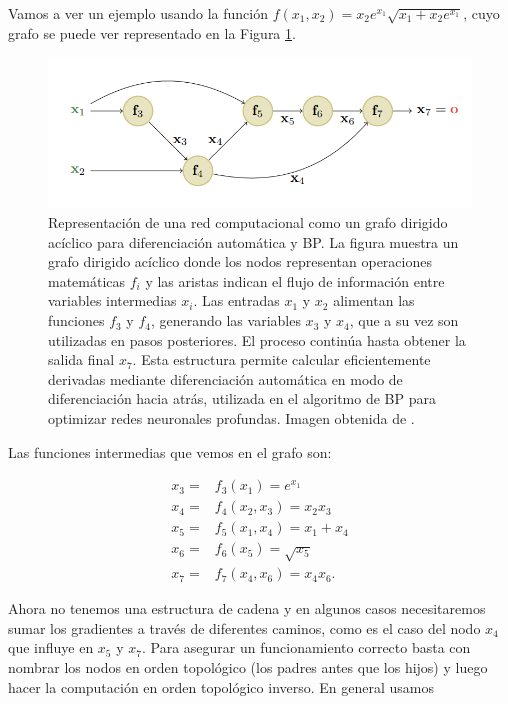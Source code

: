 Vamos a ver un ejemplo usando la función $f(x_1,x_2)=x_2e^{x_1}\sqrt{x_1+x_2e^{x_1}}$, cuyo grafo se puede ver representado en la Figura \ref{fig:def.grafo}.


\begin{figure}
    \centering
    \includegraphics[width=1.0\linewidth]{Plantilla_TFG_latex/imagenes/Mat/Definicion/graf.png}
    \caption[Representación de una red computacional como un grafo dirigido acíclico para diferenciación automática y \textit{backpropagation}]{Representación de una red computacional como un grafo dirigido acíclico para diferenciación automática y BP. La figura muestra un grafo dirigido acíclico donde los nodos representan operaciones matemáticas $f_i$  y las aristas indican el flujo de información entre variables intermedias $x_i$. Las entradas $x_1$ y $x_2$ alimentan las funciones $f_3$ y $f_4$, generando las variables $x_3$ y $x_4$, que a su vez son utilizadas en pasos posteriores. El proceso continúa hasta obtener la salida final $x_7$. Esta estructura permite calcular eficientemente derivadas mediante diferenciación automática en modo de diferenciación hacia atrás, utilizada en el algoritmo de BP para optimizar redes neuronales profundas. Imagen obtenida de \cite{pml1Book}.}
    \label{fig:def.grafo}
\end{figure}


Las funciones intermedias que vemos en el grafo son:

\begin{align*}
x_3= &f_3(x_1)=e^{x_1} \\
x_4 = &f_4(x_2,x_3)=x_2x_3 \\
x_5=&f_5(x_1,x_4)=x_1 + x_4 \\
x_6=&f_6(x_5) = \sqrt{x_5} \\
x_7=&f_7(x_4,x_6)=x_4x_6 .
\end{align*}

Ahora no tenemos una estructura de cadena y en algunos casos necesitaremos sumar los gradientes a través de diferentes caminos, como es el caso del nodo $x_4$ que influye en $x_5$ y $x_7$. Para asegurar un funcionamiento correcto basta con nombrar los nodos en orden topológico (los padres antes que los hijos) y luego hacer la computación en orden topológico inverso. En general usamos

